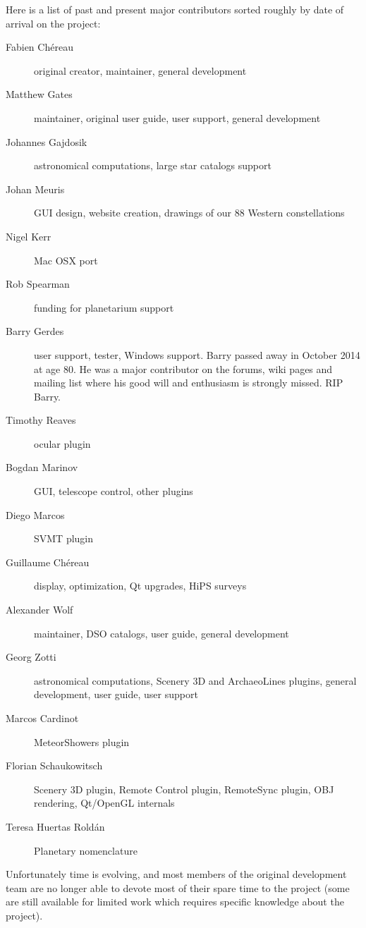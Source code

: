 Here is a list of past and present major contributors sorted roughly by date of
arrival on the project:
\newpage
\begin{description}
\item[Fabien Ch\'ereau] original creator, maintainer, general development
\item[Matthew Gates] maintainer, original user guide, user support, general development
\item[Johannes Gajdosik] astronomical computations, large star catalogs support
\item[Johan Meuris] GUI design, website creation, drawings of our 88 Western constellations
\item[Nigel Kerr] Mac OSX port
\item[Rob Spearman] funding for planetarium support
\item[Barry Gerdes] user support, tester, Windows support. Barry
  passed away in October 2014 at age 80. He was a major contributor on
  the forums, wiki pages and mailing list where his good will and
  enthusiasm is strongly missed.  RIP Barry.
\item[Timothy Reaves] ocular plugin
\item[Bogdan Marinov] GUI, telescope control, other plugins
\item[Diego Marcos] SVMT plugin
\item[Guillaume Ch\'ereau] display, optimization, Qt upgrades, HiPS surveys
\item[Alexander Wolf] maintainer, DSO catalogs, user guide, general development
\item[Georg Zotti] astronomical computations, Scenery 3D and ArchaeoLines plugins, general development, user guide, user support
\item[Marcos Cardinot] MeteorShowers plugin
\item[Florian Schaukowitsch] Scenery 3D plugin, Remote Control plugin, RemoteSync plugin, OBJ rendering, Qt/OpenGL internals
\item[Teresa Huertas Roldán] Planetary nomenclature 
\end{description}

Unfortunately time is evolving, and most members of the original
development team are no longer able to devote most of their spare time
to the project (some are still available for limited work
which requires specific knowledge about the project).


